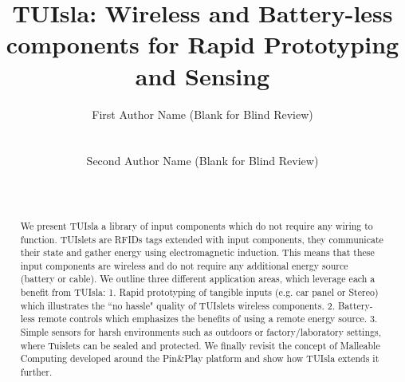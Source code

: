 \documentclass{ubicomp2013}
\begin{document}
\setlength{\paperheight}{11in}
\setlength{\paperwidth}{8.5in}
\setlength{\pdfpageheight}{\paperheight}
\setlength{\pdfpagewidth}{\paperwidth}




\title{TUIsla: Wireless and Battery-less components \newline for Rapid Prototyping and Sensing}
\author{
  \alignauthor First Author Name (Blank for Blind Review)\\
    \\
    \\
 \alignauthor Second Author Name (Blank for Blind Review)\\
    \\
    \\
      }
\maketitle

\begin{abstract}
We present TUIsla a library of input components which do not require any wiring to function.
TUIslets are RFIDs tags extended with input components, they communicate their state and gather energy using electromagnetic induction. This means that these input components are wireless and do not require any additional energy source (battery or cable). 
We outline three different application areas, which leverage each a benefit from TUIsla: 1. Rapid prototyping of tangible inputs (e.g. car panel or Stereo) which illustrates the ``no hassle" quality of TUIslets wireless components. 
2. Battery-less remote controls which emphasizes the benefits of using a remote energy source.
3. Simple sensors for harsh environments such as outdoors or factory/laboratory settings, where Tuislets can be sealed and protected.
We finally revisit the concept of Malleable Computing developed around the Pin\&Play platform and show how TUIsla extends it further. 
\end{abstract}
\end{document}

